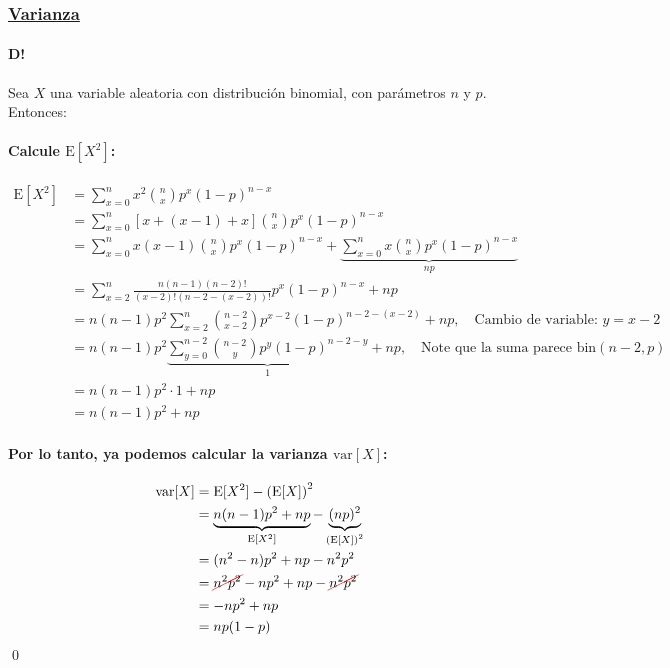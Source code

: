 \documentclass[8pt]{article}
\newcommand{\Cancel}[2][black]{{\color{#1}\cancel{\color{black}#2}}} %
\begin{document}
\subsubsection*{\hyperref[subsec:varianza_binom_tag]{Varianza}}
\label{subsec:varianza_binom}

\paragraph{D!} Sea $X$ una variable aleatoria con distribución binomial, con parámetros $n$ y $p$. Entonces:

\paragraph*{Calcule $\text{E}[X^2]$:}

\begin{align*}
    \text{E}[X^2] &= \sum_{x=0}^n x^2 \binom{n}{x} p^x (1-p)^{n-x} \\
    &= \sum_{x=0}^n [x+(x-1)+x]\binom{n}{x} p^x (1-p)^{n-x} \\
    &= \sum_{x=0}^n x(x-1) \binom{n}{x} p^x (1-p)^{n-x} + \underbrace{\sum_{x=0}^n x \binom{n}{x} p^x (1-p)^{n-x}}_{np} \\ 
    &= \sum_{x=2}^n \frac{n(n-1)(n-2)!}{(x-2)!(n-2-(x-2))!} p^x (1-p)^{n-x} + np \\
    &= n(n-1)p^2 \sum_{x=2}^n \binom{n-2}{x-2} p^{x-2} (1-p)^{n-2-(x-2)} + np, \quad \text{Cambio de variable: } y = x-2 \\
    &= n(n-1)p^2 \underbrace{\sum_{y=0}^{n-2} \binom{n-2}{y} p^y (1-p)^{n-2-y}}_{1} + np, \quad \text{Note que la suma parece bin} (n-2, p) \\
    &= n(n-1)p^2 \cdot 1 + np \\
    &= n(n-1)p^2 + np
\end{align*}

\paragraph*{Por lo tanto, ya podemos calcular la varianza $\text{var}[X]$:}

\begin{align*}
    \text{var}[X] &= \text{E}[X^2] - \left(\text{E}[X]\right)^2 \\
    &= \underbrace{n(n-1)p^2 + np}_{\text{E}[X^2]} - \underbrace{(np)^2}_{\left(\text{E}[X]\right)^2} \\
    &= (n^2-n)p^2 + np - n^2p^2 \\
    &= \Cancel[red]{n^2p^2} - np^2 + np - \Cancel[red]{n^2p^2} \\
    &=  -np^2 + np \\
    &=  np(1-p)
\end{align*}\qed
\end{document}
